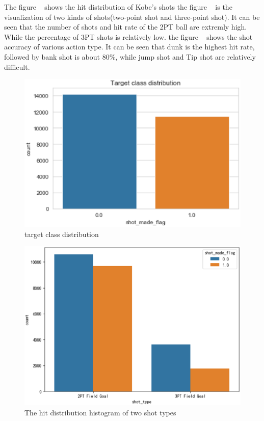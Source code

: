 The figure ~ 
shows the hit distribution of Kobe's shots  
the figure ~ 
is the visualization of two kinds of shots(two-point shot and three-point shot).
It can be seen that the number of shots and hit rate of the 2PT ball are extremly high. 
While the percentage of 3PT shots is relatively low.
the figure ~ 
shows the shot accuracy of various action type.
It can be seen that dunk is the highest hit rate, followed by bank shot is about 80\%,
 while jump shot and Tip shot are relatively difficult.



\begin{figure}[htbp]
	\centering
	\includegraphics[scale=0.8]{c.eps}        %
	\caption{target class distribution}
	\label{fig3}
\end{figure}
\begin{figure}[htbp]
	\centering
	\includegraphics[scale=0.3]{d.eps
	}        %
	\caption{The hit distribution histogram of two shot types}
	\label{fig4}
\end{figure}

